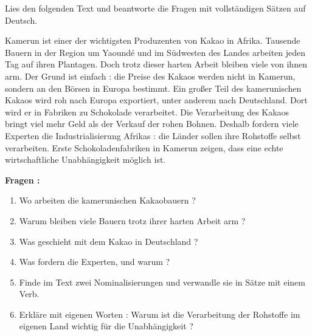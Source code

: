 \documentclass[11pt]{article}
\newcounter{popsec}
\newcounter{popsub}
\newcommand{\courssub}[1]{%
  \stepcounter{popsub}%
  \par\vspace{9pt}\noindent{\popxbold\fontsize{11.5}{13}\selectfont\color{popink}{\color{poporange}\thepopsec.\thepopsub}\hspace{6pt}#1}\par\nopagebreak\vspace{4pt}
}
\begin{document}
\courssub{Je me prépare au Bac}

\begin{exercice}
Lies den folgenden Text und beantworte die Fragen mit vollständigen Sätzen auf Deutsch.

\begin{textebox}
Kamerun ist einer der wichtigsten Produzenten von Kakao in Afrika. Tausende Bauern in der Region um Yaoundé und im Südwesten des Landes arbeiten jeden Tag auf ihren Plantagen. Doch trotz dieser harten Arbeit bleiben viele von ihnen arm. Der Grund ist einfach : die Preise des Kakaos werden nicht in Kamerun, sondern an den Börsen in Europa bestimmt. Ein großer Teil des kamerunischen Kakaos wird roh nach Europa exportiert, unter anderem nach Deutschland. Dort wird er in Fabriken zu Schokolade verarbeitet. Die Verarbeitung des Kakaos bringt viel mehr Geld als der Verkauf der rohen Bohnen. Deshalb fordern viele Experten die Industrialisierung Afrikas : die Länder sollen ihre Rohstoffe selbst verarbeiten. Erste Schokoladenfabriken in Kamerun zeigen, dass eine echte wirtschaftliche Unabhängigkeit möglich ist.
\end{textebox}

\textbf{Fragen :}
\begin{enumerate}
\item Wo arbeiten die kamerunischen Kakaobauern ?
\item Warum bleiben viele Bauern trotz ihrer harten Arbeit arm ?
\item Was geschieht mit dem Kakao in Deutschland ?
\item Was fordern die Experten, und warum ?
\item Finde im Text zwei Nominalisierungen und verwandle sie in Sätze mit einem Verb.
\item Erkläre mit eigenen Worten : Warum ist die Verarbeitung der Rohstoffe im eigenen Land wichtig für die Unabhängigkeit ?
\end{enumerate}
\end{exercice}
\end{document}
